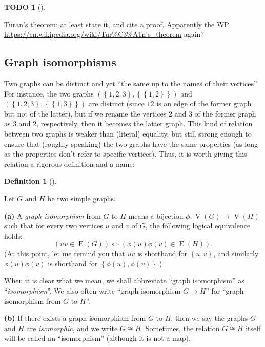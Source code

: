 \documentclass[numbers=enddot,12pt,final,onecolumn,notitlepage]{scrartcl}%
\theoremstyle{definition}
\newtheorem{defi}[theo]{Definition}
\newenvironment{definition}[1][]
{\begin{defi}[#1]\begin{leftbar}}
{\end{leftbar}\end{defi}}
\newtheorem{quest}[theo]{TODO}
\newenvironment{todo}[1][]
{\begin{quest}[#1]\begin{leftbar}}
{\end{leftbar}\end{quest}}
\newcommand{\set}[1]{\left\{ #1 \right\}}
\newcommand{\tup}[1]{\left( #1 \right)}
\newcommand{\verts}[1]{\operatorname{V}\left( #1 \right)}
\newcommand{\edges}[1]{\operatorname{E}\left( #1 \right)}
\begin{document}
\begin{todo}
Turan's theorem: at least state it, and cite a proof.
Apparently the WP
\url{https://en.wikipedia.org/wiki/Tur%C3%A1n's_theorem} again?
\end{todo}

\subsection{\label{sect.intro.iso}Graph isomorphisms}

Two graphs can be distinct and yet ``the same up to the names of their
vertices''. For instance, the two graphs
$\tup{\set{1,2,3},\set{\set{1,2}}}$ and
$\tup{\set{1,2,3},\set{\set{1,3}}}$ are distinct (since $12$ is an
edge of the former graph but not of the latter), but if we rename the
vertices $2$ and $3$ of the former graph as $3$ and $2$, respectively,
then it becomes the latter graph. This kind of relation between two
graphs is weaker than (literal) equality, but still strong enough to
ensure that (roughly speaking) the two graphs have the same properties
(as long as the properties don't refer to specific vertices). Thus,
it is worth giving this relation a rigorous definition and a name:

\begin{definition} \label{def.intro.iso}
Let $G$ and $H$ be two simple graphs.

\textbf{(a)} A \textit{graph isomorphism} from $G$ to $H$ means a
bijection $\phi : \verts{G} \to \verts{H}$ such that for every two
vertices $u$ and $v$ of $G$, the following logical equivalence holds:
\begin{equation}
\left( uv \in \edges{G} \right)
\Longleftrightarrow
\left( \phi\tup{u}\phi\tup{v} \in \edges{H} \right) .
\label{eq.def.intro.iso.a.eq}
\end{equation}
(At this point, let me remind you that $uv$ is shorthand for
$\set{u,v}$, and similarly $\phi\tup{u}\phi\tup{v}$ is shorthand for
$\set{\phi\tup{u},\phi\tup{v}}$.)

When it is clear what we mean, we shall abbreviate
``graph isomorphism'' as ``\textit{isomorphism}''. We also often write
``graph isomorphism $G \to H$'' for ``graph isomorphism from $G$ to
$H$''.

\textbf{(b)} If there exists a graph isomorphism from $G$ to $H$, then
we say the graphs $G$ and $H$ are \textit{isomorphic}, and
we write $G \cong H$. Sometimes, the relation $G \cong H$ itself will
be called an ``isomorphism'' (although it is not a map).
\end{definition}
\end{document}
